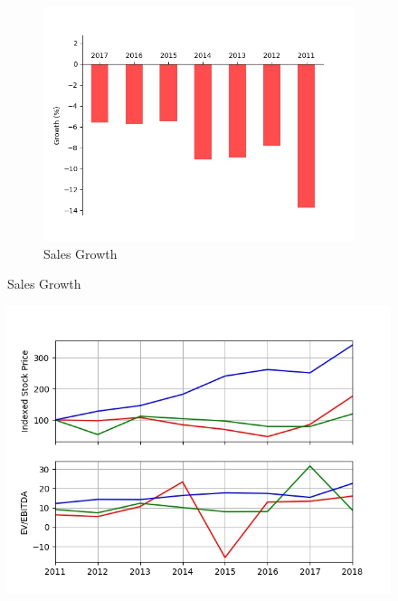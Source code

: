 \documentclass{article}
\newcommand{\company}{Company}
\begin{document}
\begin{figure}[!h]
\begin{subfigure}[b]{0.4\linewidth}
\includegraphics[width=\linewidth]{charts/sales_growth.jpg}
\caption{Sales Growth}
\end{subfigure}

\end{figure}
\caption{\company Analysis}

\begin{figure}[!h]

\includegraphics[width=\linewidth]{charts/comps_graph.jpg}

\end{figure}
\end{document}
